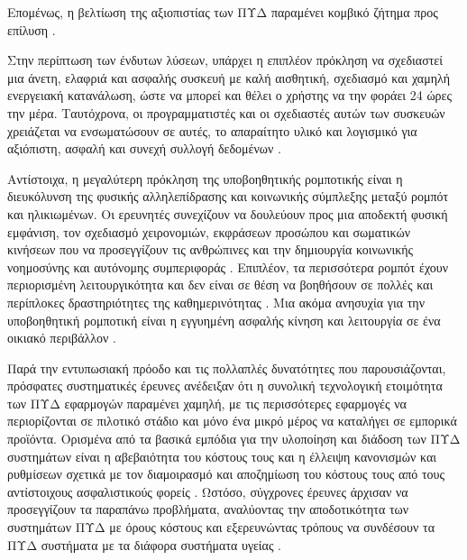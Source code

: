 Επομένως, η βελτίωση της αξιοπιστίας των ΠΥΔ παραμένει κομβικό ζήτημα προς επίλυση \cite{Liu2016}\cite{rashidi2012survey}\cite{cardinaux}.
\par
Στην περίπτωση των ένδυτων λύσεων, υπάρχει η επιπλέον πρόκληση να σχεδιαστεί μια άνετη, ελαφριά και ασφαλής συσκευή με καλή αισθητική, σχεδιασμό και χαμηλή ενεργειακή κατανάλωση, ώστε να μπορεί και θέλει ο χρήστης να την φοράει 24 ώρες την μέρα.
Ταυτόχρονα, οι προγραμματιστές και οι σχεδιαστές αυτών των συσκευών χρειάζεται να ενσωματώσουν σε αυτές, το απαραίτητο υλικό και λογισμικό για αξιόπιστη, ασφαλή και συνεχή συλλογή δεδομένων \cite{Ghayvat2015}.
\par
Αντίστοιχα, η μεγαλύτερη πρόκληση της υποβοηθητικής ρομποτικής είναι η διευκόλυνση της φυσικής αλληλεπίδρασης και κοινωνικής σύμπλεξης μεταξύ ρομπότ και ηλικιωμένων.
Οι ερευνητές συνεχίζουν να δουλεύουν προς μια αποδεκτή φυσική εμφάνιση, τον σχεδιασμό χειρονομιών, εκφράσεων προσώπου και σωματικών κινήσεων που να προσεγγίζουν τις ανθρώπινες και την δημιουργία κοινωνικής νοημοσύνης και αυτόνομης συμπεριφοράς \cite{Robinson2014}\cite{Mataric2017}.
Επιπλέον, τα περισσότερα ρομπότ έχουν περιορισμένη λειτουργικότητα και δεν είναι σε θέση να βοηθήσουν σε πολλές και περίπλοκες δραστηριότητες της καθημερινότητας \cite{rashidi2012survey}.
Μια ακόμα ανησυχία για την υποβοηθητική ρομποτική είναι η εγγυημένη ασφαλής κίνηση και λειτουργία σε ένα οικιακό περιβάλλον \cite{Salem2015}.
\par
Παρά την εντυπωσιακή πρόοδο και τις πολλαπλές δυνατότητες που παρουσιάζονται, πρόσφατες συστηματικές έρευνες\cite{Liu2016}\cite{Memon2014} ανέδειξαν ότι η συνολική τεχνολογική ετοιμότητα των ΠΥΔ εφαρμογών παραμένει χαμηλή, με τις περισσότερες εφαρμογές να περιορίζονται σε πιλοτικό στάδιο και μόνο ένα μικρό μέρος να καταλήγει σε εμπορικά προϊόντα.
Ορισμένα από τα βασικά εμπόδια για την υλοποίηση και διάδοση των ΠΥΔ συστημάτων είναι η αβεβαιότητα του κόστους τους και η έλλειψη κανονισμών και ρυθμίσεων σχετικά με τον διαμοιρασμό και αποζημίωση του κόστους τους από τους αντίστοιχους ασφαλιστικούς φορείς \cite{rashidi2012survey}\cite{Reeder2013}\cite{Vimarlund2014}.
Ωστόσο, σύγχρονες έρευνες άρχισαν να προσεγγίζουν τα παραπάνω προβλήματα, αναλύοντας την αποδοτικότητα των συστημάτων ΠΥΔ με όρους κόστους και εξερευνώντας τρόπους να συνδέσουν τα ΠΥΔ συστήματα με τα διάφορα συστήματα υγείας \cite{Manetti2017}.

